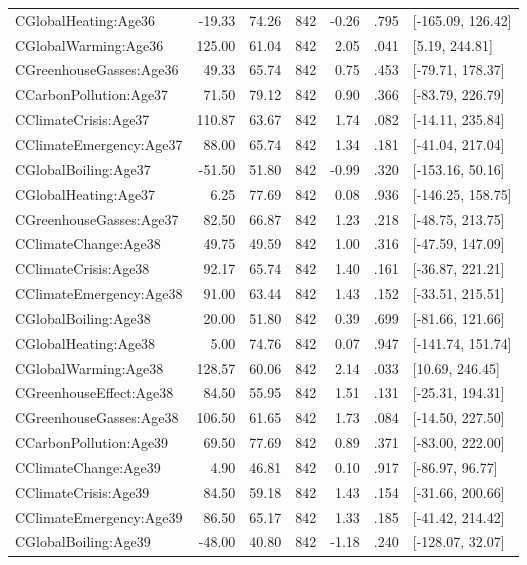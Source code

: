 \begin{table}[ht]
\begin{tabular}{lrrrrrl}
  CGlobalHeating:Age36 & -19.33 & 74.26 & 842 & -0.26 & .795 & [-165.09, 126.42] \\ 
  CGlobalWarming:Age36 & 125.00 & 61.04 & 842 & 2.05 & .041 & [5.19, 244.81] \\ 
  CGreenhouseGasses:Age36 & 49.33 & 65.74 & 842 & 0.75 & .453 & [-79.71, 178.37] \\ 
  CCarbonPollution:Age37 & 71.50 & 79.12 & 842 & 0.90 & .366 & [-83.79, 226.79] \\ 
  CClimateCrisis:Age37 & 110.87 & 63.67 & 842 & 1.74 & .082 & [-14.11, 235.84] \\ 
  CClimateEmergency:Age37 & 88.00 & 65.74 & 842 & 1.34 & .181 & [-41.04, 217.04] \\ 
  CGlobalBoiling:Age37 & -51.50 & 51.80 & 842 & -0.99 & .320 & [-153.16, 50.16] \\ 
  CGlobalHeating:Age37 & 6.25 & 77.69 & 842 & 0.08 & .936 & [-146.25, 158.75] \\ 
  CGreenhouseGasses:Age37 & 82.50 & 66.87 & 842 & 1.23 & .218 & [-48.75, 213.75] \\ 
  CClimateChange:Age38 & 49.75 & 49.59 & 842 & 1.00 & .316 & [-47.59, 147.09] \\ 
  CClimateCrisis:Age38 & 92.17 & 65.74 & 842 & 1.40 & .161 & [-36.87, 221.21] \\ 
  CClimateEmergency:Age38 & 91.00 & 63.44 & 842 & 1.43 & .152 & [-33.51, 215.51] \\ 
  CGlobalBoiling:Age38 & 20.00 & 51.80 & 842 & 0.39 & .699 & [-81.66, 121.66] \\ 
  CGlobalHeating:Age38 & 5.00 & 74.76 & 842 & 0.07 & .947 & [-141.74, 151.74] \\ 
  CGlobalWarming:Age38 & 128.57 & 60.06 & 842 & 2.14 & .033 & [10.69, 246.45] \\ 
  CGreenhouseEffect:Age38 & 84.50 & 55.95 & 842 & 1.51 & .131 & [-25.31, 194.31] \\ 
  CGreenhouseGasses:Age38 & 106.50 & 61.65 & 842 & 1.73 & .084 & [-14.50, 227.50] \\ 
  CCarbonPollution:Age39 & 69.50 & 77.69 & 842 & 0.89 & .371 & [-83.00, 222.00] \\ 
  CClimateChange:Age39 & 4.90 & 46.81 & 842 & 0.10 & .917 & [-86.97, 96.77] \\ 
  CClimateCrisis:Age39 & 84.50 & 59.18 & 842 & 1.43 & .154 & [-31.66, 200.66] \\ 
  CClimateEmergency:Age39 & 86.50 & 65.17 & 842 & 1.33 & .185 & [-41.42, 214.42] \\ 
  CGlobalBoiling:Age39 & -48.00 & 40.80 & 842 & -1.18 & .240 & [-128.07, 32.07] \\ 

\end{tabular}
\end{table}
